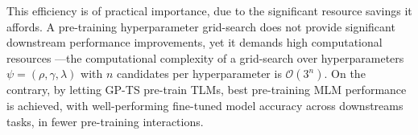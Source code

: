 \clearpage
This efficiency is of practical importance,
due to the significant resource savings it affords.
A pre-training hyperparameter grid-search
does not provide significant downstream performance improvements,
yet it demands high computational resources
---the computational complexity of a grid-search over hyperparameters $\psi=\left(\rho, \gamma, \lambda\right)$ with $n$ candidates per hyperparameter is $\mathcal{O}(3^n)$.
%
On the contrary, by letting GP-TS pre-train TLMs,
best pre-training MLM performance is achieved,
with well-performing fine-tuned model accuracy across downstreams tasks,
in fewer pre-training interactions.

